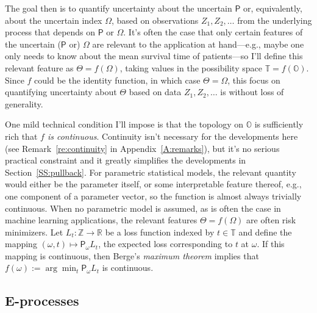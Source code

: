 \documentclass[a4paper, 12pt]{article}
\theoremstyle{plain}
\theoremstyle{definition}
\theoremstyle{remark}
\newcommand{\prob}{\mathsf{P}}
\newcommand{\RR}{\mathbb{R}}
\newcommand{\OO}{\mathbb{O}}
\newcommand{\ZZ}{\mathbb{Z}}
\newcommand{\TT}{\mathbb{T}}
\begin{document}
The goal then is to quantify uncertainty about the uncertain $\prob$ or, equivalently, about the uncertain index $\Omega$, based on observations $Z_1,Z_2,\ldots$ from the underlying process that depends on $\prob$ or $\Omega$.  It's often the case that only certain features of the uncertain ($\prob$ or) $\Omega$ are relevant to the application at hand---e.g., maybe one only needs to know about the mean survival time of patients---so I'll define this relevant feature as $\Theta = f(\Omega)$, taking values in the possibility space $\TT = f(\OO)$.  
Since $f$ could be the identity function, in which case $\Theta = \Omega$, this focus on quantifying uncertainty about $\Theta$ based on data $Z_1,Z_2,\ldots$ is without loss of generality.  

One mild technical condition I'll impose is that the topology on $\OO$ is sufficiently rich that {\em $f$ is continuous}.  Continuity isn't necessary for the developments here (see Remark~\ref{re:continuity} in Appendix~\ref{A:remarks}), but it's no serious practical constraint and it greatly simplifies the developments in Section~\ref{SS:pullback}.  
For parametric statistical models, the relevant quantity would either be the parameter itself, or some interpretable feature thereof, e.g., one component of a parameter vector, so the function is almost always trivially continuous.  When no parametric model is assumed, as is often the case in machine learning applications, the relevant features $\Theta = f(\Omega)$ are often risk minimizers.  Let $L_t: \ZZ \to \RR$ be a loss function indexed by $t \in \TT$ and define the mapping $(\omega, t) \mapsto \prob_\omega L_t$, the expected loss corresponding to $t$ at $\omega$.  If this mapping is continuous, then Berge's {\em maximum theorem} \citep[e.g.,][Theorem~17.31]{infinite.dim.analysis} implies that $f(\omega) := \arg\min_t \prob_\omega L_t$ is continuous.  






\subsection{E-processes}
\label{SS:eprocess}
\end{document}
